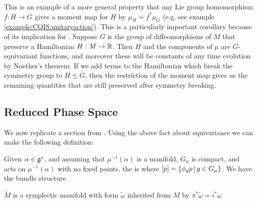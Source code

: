 \documentclass{article}
\begin{document}
\begin{remark}
This is an example of a more general property that any Lie group homomorphism $f : H \to G$ gives a moment map for $H$ by $\mu_H = f^\ast \mu_G$ (e.g. see example \ref{example:CQIS:unitaryaction}). This is a particularly important corollary because of its implication for . Suppose $G$ is the group of diffeomorphisms of $M$ that preserve a Hamiltonian $H:M \to \mathbb{R}$. Then $H$ and the components of $\mu$ are $G$-equivariant functions, and moreover these will be constants of any time evolution by Noether's theorem. If we add terms to the Hamiltonian which break the symmetry group to $H \leq G$, then the restriction of the moment map gives us the remaining quantities that are still preserved after symmetry breaking.  
\end{remark}
\subsection{Reduced Phase Space}
We now replicate a section from \cite{Moser2010}. Using the above fact about equivariance we can make the following definition:
\begin{definition}
	Given $\alpha \in \mathfrak{g}^\ast$, and assuming that $\mu^{-1}(\alpha)$ is a manifold, $G_\alpha$ is compact, and acts on $\mu^{-1}(\alpha)$ with no fixed points, the  is 
	where $[p] = \left\{ \phi_g p \, | \, g \in G_\mu \right\}$. 
	We have the bundle structure 
	\begin{center}
	\end{center}
\end{definition}

$\tilde{M}$ is a symplectic manifold with form $\tilde{\omega}$ inherited from $M$ by $\pi^\ast \tilde{\omega} = i^\ast \omega$

\begin{center}
\end{center}
\end{document}
